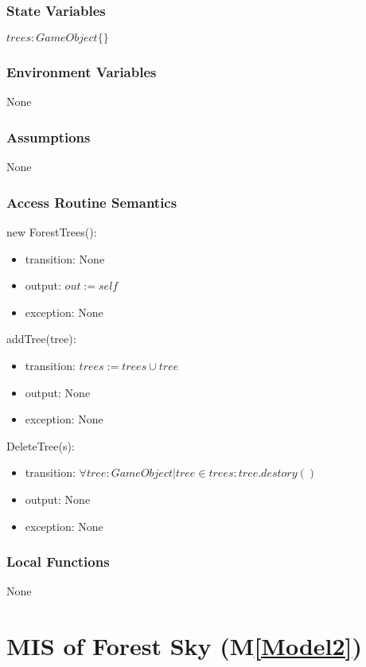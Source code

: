 \documentclass[12pt, titlepage]{article}
\newcommand{\mref}[1]{M\ref{#1}}
\begin{document}
\subsubsection{State Variables}
$\mathit{trees: GameObject\{\} }$

\subsubsection{Environment Variables}
None

\subsubsection{Assumptions}
None

\subsubsection{Access Routine Semantics}
\noindent new ForestTrees():
\begin{itemize}
\item transition: None
\item output: $\mathit{out := self}$
\item exception: None
\end{itemize}

\noindent addTree(tree):
\begin{itemize}
\item transition: $\mathit{trees := trees } \cup tree $ 
\item output: None
\item exception: None
\end{itemize}

\noindent DeleteTree(s):
\begin{itemize}
\item transition: $\forall tree: GameObject | tree \in trees : tree.destory()$
\item output: None
\item exception: None
\end{itemize}

\subsubsection{Local Functions}
None

\newpage

\section{MIS of Forest Sky (\mref{Model2})} 
\end{document}
